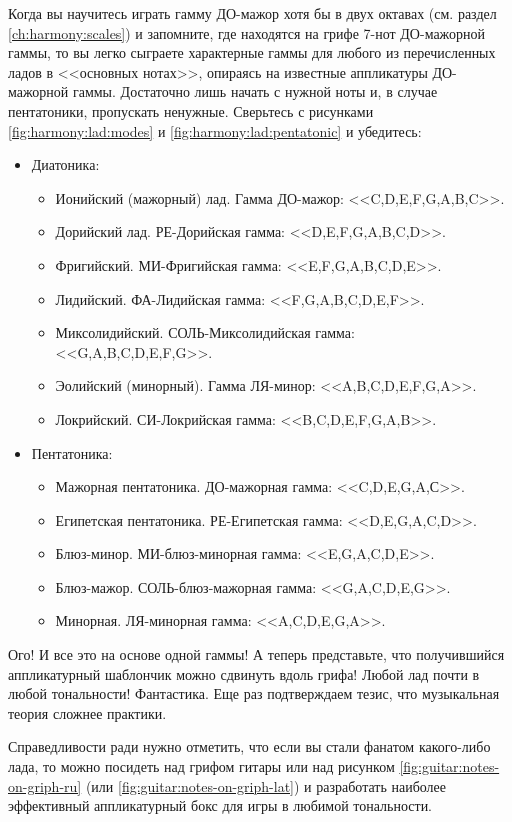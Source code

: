 Когда вы научитесь играть гамму ДО-мажор хотя бы в двух октавах (см. раздел \ref{ch:harmony:scales}) и запомните, где находятся на грифе 7-нот ДО-мажорной гаммы, то вы легко сыграете характерные гаммы для любого из перечисленных ладов в <<основных нотах>>, опираясь на известные аппликатуры ДО-мажорной гаммы. Достаточно лишь начать с нужной ноты и, в случае пентатоники, пропускать ненужные. Сверьтесь с рисунками \ref{fig:harmony:lad:modes} и \ref{fig:harmony:lad:pentatonic} и убедитесь:
\begin{itemize}
    \item Диатоника:
    \begin{itemize}
        \item Ионийский (мажорный) лад. Гамма ДО-мажор: <<C,D,E,F,G,A,B,C>>.
        \item Дорийский лад. РЕ-Дорийская гамма: <<D,E,F,G,A,B,C,D>>.
        \item Фригийский. МИ-Фригийская гамма: <<E,F,G,A,B,C,D,E>>.
        \item Лидийский. ФА-Лидийская гамма: <<F,G,A,B,C,D,E,F>>.
        \item Миксолидийский. СОЛЬ-Миксолидийская гамма: <<G,A,B,C,D,E,F,G>>.
        \item Эолийский (минорный). Гамма ЛЯ-минор: <<A,B,C,D,E,F,G,A>>.
        \item Локрийский. СИ-Локрийская гамма: <<B,C,D,E,F,G,A,B>>.
    \end{itemize}

    \item Пентатоника:
    \begin{itemize}
        \item Мажорная пентатоника. ДО-мажорная гамма: <<C,D,E,G,A,С>>.
        \item Египетская пентатоника. РЕ-Египетская гамма: <<D,E,G,A,C,D>>.
        \item Блюз-минор. МИ-блюз-минорная гамма: <<E,G,A,C,D,E>>.
        \item Блюз-мажор. СОЛЬ-блюз-мажорная гамма: <<G,A,C,D,E,G>>.
        \item Минорная. ЛЯ-минорная гамма: <<A,C,D,E,G,A>>.
    \end{itemize}
\end{itemize}

Ого! И все это на основе одной гаммы! А теперь представьте, что получившийся аппликатурный шаблончик можно сдвинуть вдоль грифа! Любой лад почти в любой тональности! Фантастика. Еще раз подтверждаем тезис, что музыкальная теория сложнее практики.

Справедливости ради нужно отметить, что если вы стали фанатом какого-либо лада, то можно посидеть над грифом гитары или над рисунком \ref{fig:guitar:notes-on-griph-ru} (или \ref{fig:guitar:notes-on-griph-lat}) и разработать наиболее эффективный аппликатурный бокс для игры в любимой тональности.
